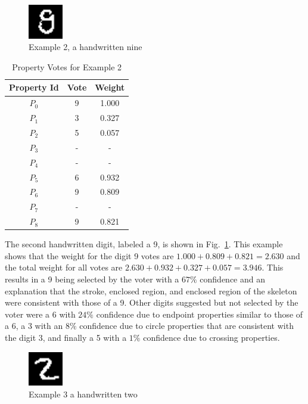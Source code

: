 \documentclass[conference]{IEEEtran}
\begin{document}
 \begin{figure}[htbp]
\centerline{\includegraphics[width=15mm]{./digit-images/9-9.png}}
\caption{Example 2,  a handwritten nine}
\label{example2}
\end{figure}

\begin{table}[htbp]
\caption{Property Votes for Example 2}
\centering
\begin{tabular}{| c | c | c |}
\hline
 Property Id & Vote & Weight \\
\hline\hline
$P_0$ & 9 & 1.000 \\ 
\hline
$P_1$ & 3 & 0.327 \\
\hline
$P_2$ & 5 & 0.057 \\
\hline
$P_3$ & - & - \\
\hline
$P_4$ & - & - \\
\hline
$P_5$ & 6 & 0.932 \\
\hline
$P_6$ & 9 & 0.809 \\
\hline
$P_7$ & - & - \\
\hline
$P_8$ & 9 & 0.821 \\
\hline
\end{tabular}
\label{table:example1}
\end{table}

The second handwritten digit,  labeled a 9, is shown in Fig.~\ref{example2}.  This example shows that the weight for the digit 9 votes are $1.000 + 0.809 + 0.821 = 2.630$ and the total weight for all votes are $2.630 + 0.932 + 0.327 + 0.057 = 3.946$.  This results in a 9 being selected by the voter with a $67\%$ confidence and an explanation that the stroke,  enclosed region, and enclosed region of the skeleton were consistent with those of a 9.  Other digits suggested but not selected by the voter were a 6 with $24\%$ confidence due to endpoint properties similar to those of a 6, a 3 with an $8\%$ confidence due to circle properties that are consistent with the digit 3, and finally a 5 with a $1\%$ confidence due to crossing properties.

 \begin{figure}[htbp]
\centerline{\includegraphics[width=15mm]{./digit-images/2-4.png}}
\caption{Example 3  a handwritten two}
\label{example3}
\end{figure}
\end{document}
